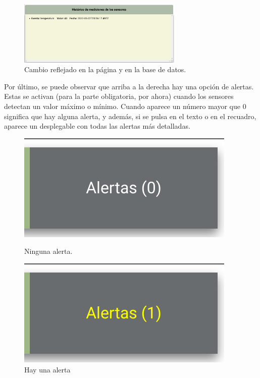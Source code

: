 \documentclass{article}
\begin{document}
\begin{figure}[H]
    \centering
    \includegraphics[width=0.7\textwidth]{images/cambiovalordb.png}
    \caption{Cambio reflejado en la página y en la base de datos.}
\end{figure}


Por último, se puede observar que arriba a la derecha hay una opción de alertas. Estas se activan (para la parte obligatoria, por ahora) cuando los sensores detectan un valor máximo o mínimo. Cuando aparece un número mayor que 0 significa que hay alguna alerta, y además, si se pulsa en el texto o en el recuadro, aparece un desplegable con todas las alertas más detalladas.

\begin{figure}[H]
    \centering
    \begin{minipage}[H]{0.49\textwidth}
        \centering
        \includegraphics[width=\textwidth]{images/alerta0.png}
        \caption{Ninguna alerta.}
    \end{minipage}
    \hfill
    \begin{minipage}[H]{0.49\textwidth}
        \centering
        \includegraphics[width=\textwidth]{images/alerta1.png}
        \caption{Hay una alerta}
    \end{minipage}
\end{figure}
\end{document}
